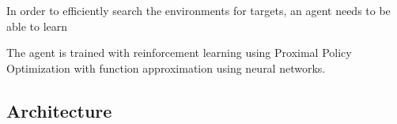 



In order to efficiently search the environments for targets, an agent needs to be able to learn 

The agent is trained with reinforcement learning using Proximal Policy Optimization with function approximation using neural networks. 







\subsection{Architecture}

